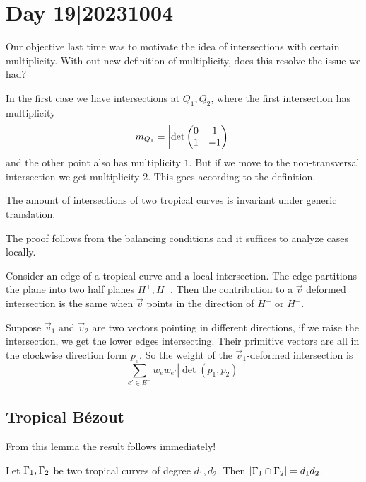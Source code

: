 \documentclass[12pt]{memoir}
\begin{document}
\section{Day 19|20231004}

Our objective last time was to motivate the idea of intersections with certain multiplicity. With out new definition of multiplicity, does this resolve the issue we had? 

\begin{Ex}
In the first case we have intersections at $Q_1,Q_2$, where the first intersection has multiplicity
$$m_{Q_1}=\left|\det\begin{pmatrix} 0 & 1 \\ 1 & -1 \end{pmatrix}\right|$$
and the other point also has multiplicity $1$. But if we move to the non-transversal intersection we get multiplicity $2$. This goes according to the definition. 
\end{Ex}

\begin{Lem}
The amount of intersections of two tropical curves is invariant under generic translation.
\end{Lem}

The proof follows from the balancing conditions and it suffices to analyze cases locally.

\begin{ptcbp}
Consider an edge of a tropical curve and a local intersection. The edge partitions the plane into two half planes $H^+,H^-$. Then the contribution to a $\vec v$ deformed intersection is the same when $\vec v$ points in the direction of $H^+$ or $H^-$.\par 
Suppose $\vec v_1$ and $\vec v_2$ are two vectors pointing in different directions, if we raise the intersection, we get the lower edges intersecting. Their primitive vectors are all in the clockwise direction form $p_e$. So the weight of the $\vec v_1$-deformed intersection is 
           $$\sum_{e'\in E^-}w_ew_{e'}|\det(p_1,p_2)|$$
\end{ptcbp}

\subsection{Tropical Bézout}

From this lemma the result follows immediately!

\begin{Th}
Let $\Gamma_1,\Gamma_2$ be two tropical curves of degree $d_1,d_2$. Then $|\Gamma_1\cap\Gamma_2|=d_1d_2$.
\end{Th}
\end{document}
